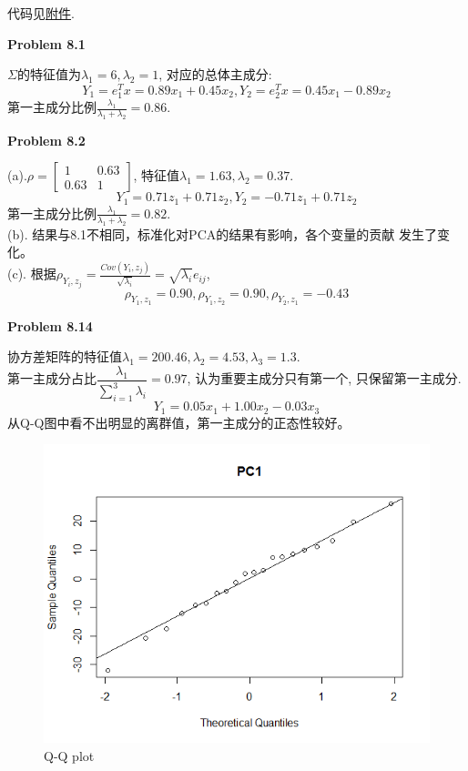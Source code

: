 \documentclass[UTF8,12pt]{article}
\newenvironment{problem}[2][Problem]
{ \begin{mdframed}[backgroundcolor=gray!20] \textbf{#1 #2}}
	{  \end{mdframed}}
\newenvironment{answer}
{%
}
{}
\begin{document}
\renewcommand{\qed}{\quad\qedsymbol}
代码见\href{hw4code.pdf}{附件}.

\begin{problem}{8.1}
\end{problem}
\begin{answer}
	$\Sigma$的特征值为$\lambda_1=6,\lambda_2=1$, 对应的总体主成分:
	$$
	Y_1 = e_1^T x = 0.89x_1+0.45x_2, Y_2=e_2^T x = 0.45x_1-0.89x_2
	$$
	第一主成分比例$\frac{\lambda_1}{\lambda_1+\lambda_2}=0.86$.
\end{answer}

\begin{problem}{8.2}
\end{problem}
\begin{answer}
	(a).$\rho=\begin{bmatrix}
		1 & 0.63\\
		0.63 & 1
	\end{bmatrix}$, 特征值$\lambda_1=1.63, \lambda_2=0.37$.
	$$
	Y_1 = 0.71 z_1 + 0.71 z_2, Y_2 = -0.71 z_1 + 0.71 z_2
	$$
	第一主成分比例$\frac{\lambda_1}{\lambda_1+\lambda_2}=0.82$.\\
	(b). 结果与8.1不相同，标准化对PCA的结果有影响，各个变量的贡献
	发生了变化。\\
	(c). 根据$\rho_{Y_i,z_j}=\frac{Cov(Y_i, z_j)}{\sqrt{\lambda_i}}=
	\sqrt{\lambda_i}e_{ij}$,
	$$
	\rho_{Y_1,z_1}=0.90, \rho_{Y_1,z_2}=0.90, \rho_{Y_2, z_1}=-0.43
	$$
\end{answer}

\begin{problem}{8.14}
\end{problem}
\begin{answer}
	协方差矩阵的特征值$\lambda_1=200.46,\lambda_2=4.53,\lambda_3=1.3$.\\
	第一主成分占比$\dfrac{\lambda_1}{\sum_{i=1}^3 \lambda_i}=0.97$, 
	认为重要主成分只有第一个, 只保留第一主成分.$$
	Y_1 = 0.05x_1+1.00x_2-0.03x_3
	$$
	从Q-Q图中看不出明显的离群值，第一主成分的正态性较好。\\
	\begin{figure}[H]
		\centering
		\includegraphics[scale=0.8]{QQplot.png}
		\caption{Q-Q plot}
	\end{figure}

\end{answer}
\end{document}
